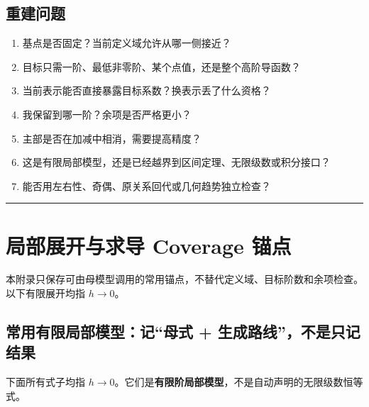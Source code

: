 \documentclass[11pt,a4paper]{ctexart}
\begin{document}
\subsection{重建问题}
\begin{enumerate}
  \item 基点是否固定？当前定义域允许从哪一侧接近？
  \item 目标只需一阶、最低非零阶、某个点值，还是整个高阶导函数？
  \item 当前表示能否直接暴露目标系数？换表示丢了什么资格？
  \item 我保留到哪一阶？余项是否严格更小？
  \item 主部是否在加减中相消，需要提高精度？
  \item 这是有限局部模型，还是已经越界到区间定理、无限级数或积分接口？
  \item 能否用左右性、奇偶、原关系回代或几何趋势独立检查？
\end{enumerate}

\begin{center}\rule{0.5\linewidth}{0.5pt}\end{center}

\appendix
\section{局部展开与求导 Coverage 锚点}

本附录只保存可由母模型调用的常用锚点，不替代定义域、目标阶数和余项检查。以下有限展开均指 $h\to0$。

\subsection{常用有限局部模型：记“母式 + 生成路线”，不是只记结果}

下面所有式子均指 $h\to0$。它们是\textbf{有限阶局部模型}，不是自动声明的无限级数恒等式。
\end{document}
